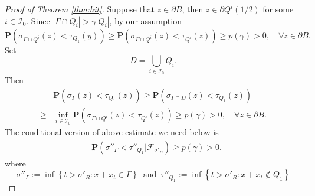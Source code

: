 \documentclass[twoside, 12pt]{book}
\numberwithin{equation}{chapter}
\def\cF{{\mathcal F}}
\def\cI{{\mathcal I}}
\def\bP{{\mathbf P}}
\def\l{\left}
\def\r{\right}
\def\geq{\geqslant}
\def\p{\partial}
\begin{document}
\begin{proof}[Proof of Theorem \ref{thm:hit}]
		Suppose that $z\in \p B$, then $z\in \p Q^i(1/2)$ for some $i\in \cI_0$. Since $|\Gamma \cap Q_i|>\gamma |Q_i|$, by our assumption 
		\begin{equation*}
			\bP\l( \sigma_{\Gamma\cap Q^i} (z) < \tau_{Q_1}(y) \r)\geq \bP(\sigma_{\Gamma\cap Q^i} (z) <\tau_{Q^i}(z)) \geq p(\gamma)>0, \quad \forall z\in \p B. 
		\end{equation*}
        Set 
        \[
            D= \bigcup_{i\in \cI_0} Q_i. 
        \]
        Then 
        \begin{equation*}
            \begin{aligned}
                &\bP(\sigma_{\Gamma}(z)<\tau_{Q_1}(z))\geq 
                \bP\l( \sigma_{\Gamma\cap D} (z) < \tau_{Q_1}(z) \r)\\
                \geq& \inf_{i\in \cI_0}\bP(\sigma_{\Gamma\cap Q^i} (z) <\tau_{Q^i}(z)) \geq p(\gamma)>0, \quad \forall z\in \p B. 
            \end{aligned}
        \end{equation*}
        The conditional version of above estimate we need below is 
        \begin{equation}\label{eq:hit3}
            \begin{aligned}
                &\bP\l(\sigma''_{\Gamma}<\tau''_{Q_1}\big| \cF_{\sigma'_B}\r)\geq p(\gamma)>0.  
            \end{aligned}
        \end{equation}
        where 
        \[
        \sigma''_{\Gamma}:=\inf\l\{t>\sigma'_{B}: x+x_t\in \Gamma\r\} ~\mbox{ and }~ \tau''_{Q_1}:=\inf\l\{t>\sigma'_{B}: x+x_t\notin Q_1\r\}
        \]
        

\end{proof}
\end{document}
